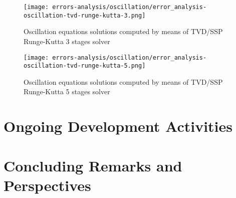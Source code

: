 \documentclass[pdftex,preprint,3p,times,numbers]{elsarticle}
\begin{document}
\begin{figure}[!ht]
  \centering
  \texttt{[image: errors-analysis/oscillation/error\_analysis-oscillation-tvd-runge-kutta-3.png]}
  \caption{Oscillation equations solutions computed by means of TVD/SSP Runge-Kutta 3 stages solver}\label{fig:results-oscillation-tvd-runge-kutta-3}
\end{figure}

\begin{figure}[!ht]
  \centering
  \texttt{[image: errors-analysis/oscillation/error\_analysis-oscillation-tvd-runge-kutta-5.png]}
  \caption{Oscillation equations solutions computed by means of TVD/SSP Runge-Kutta 5 stages solver}\label{fig:results-oscillation-tvd-runge-kutta-5}
\end{figure}

\clearpage

\section{Ongoing Development Activities}\label{sec:ongoing}

\section{Concluding Remarks and Perspectives}\label{sec:conclusions}



\end{document}
